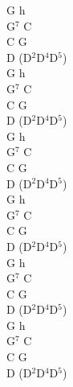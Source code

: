 \documentclass[a5paper, 10pt]{book}
\begin{document}
\begin{minipage}[t]{0.16\textwidth}
G h\\
G$^7$ C\\
C G\\
D (D$^2$D$^4$D$^5$)\\

G h\\
G$^7$ C\\
C G\\
D (D$^2$D$^4$D$^5$)\\

G h\\
G$^7$ C\\
C G\\
D (D$^2$D$^4$D$^5$)\\

G h\\
G$^7$ C\\
C G\\
D (D$^2$D$^4$D$^5$)\\

G h\\
G$^7$ C\\
C G\\
D (D$^2$D$^4$D$^5$)\\

G h\\
G$^7$ C\\
C G\\
D (D$^2$D$^4$D$^5$)\\
\end{minipage}

\newpage
\end{document}
